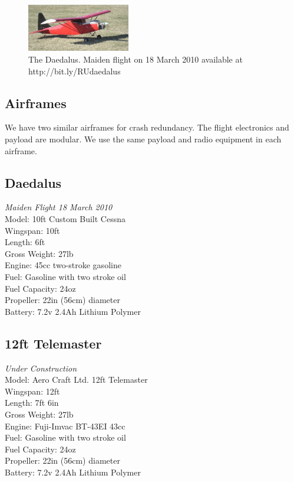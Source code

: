 \documentclass[10pt]{article}
\begin{document}
\begin{figure}[b]
  \centering
    \includegraphics[width=0.4\textwidth]{../images/daedalus.jpg}
  \captionsetup{width=.70\textwidth}
  \caption{The Daedalus. Maiden flight on 18 March 2010 available at http://bit.ly/RUdaedalus}
\end{figure}
\begin{multicols}{2}
\section{Airframes}
We have two similar airframes for crash redundancy. The flight electronics and payload are modular. We use the same payload and radio equipment in each airframe.
\subsection{Daedalus}
\emph{Maiden Flight 18 March 2010}
\\Model: 10ft Custom Built Cessna
\\Wingspan: 10ft
\\Length: 6ft
\\Gross Weight: 27lb
\\Engine: 45cc two-stroke gasoline
\\Fuel: Gasoline with two stroke oil
\\Fuel Capacity: 24oz
\\Propeller: 22in (56cm) diameter
\\Battery: 7.2v 2.4Ah Lithium Polymer
\subsection{12ft Telemaster}
\emph{Under Construction}
\\Model: Aero Craft Ltd. 12ft Telemaster
\\Wingspan: 12ft
\\Length: 7ft 6in
\\Gross Weight: 27lb
\\Engine: Fuji-Imvac BT-43EI 43cc
\\Fuel: Gasoline with two stroke oil
\\Fuel Capacity: 24oz
\\Propeller: 22in (56cm) diameter
\\Battery: 7.2v 2.4Ah Lithium Polymer


\end{multicols}
\end{document}
